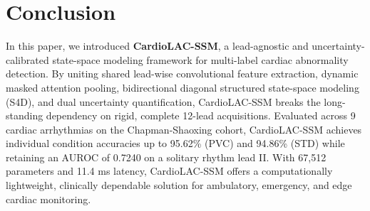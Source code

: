 \documentclass[journal,11pt,draftclsnofoot,onecolumn]{IEEEtran}
\begin{document}
\section{Conclusion}
In this paper, we introduced \textbf{CardioLAC-SSM}, a lead-agnostic and uncertainty-calibrated state-space modeling framework for multi-label cardiac abnormality detection. By uniting shared lead-wise convolutional feature extraction, dynamic masked attention pooling, bidirectional diagonal structured state-space modeling (S4D), and dual uncertainty quantification, CardioLAC-SSM breaks the long-standing dependency on rigid, complete 12-lead acquisitions. Evaluated across 9 cardiac arrhythmias on the Chapman-Shaoxing cohort, CardioLAC-SSM achieves individual condition accuracies up to 95.62\% (PVC) and 94.86\% (STD) while retaining an AUROC of 0.7240 on a solitary rhythm lead II. With 67,512 parameters and 11.4 ms latency, CardioLAC-SSM offers a computationally lightweight, clinically dependable solution for ambulatory, emergency, and edge cardiac monitoring.

\appendices
\end{document}
